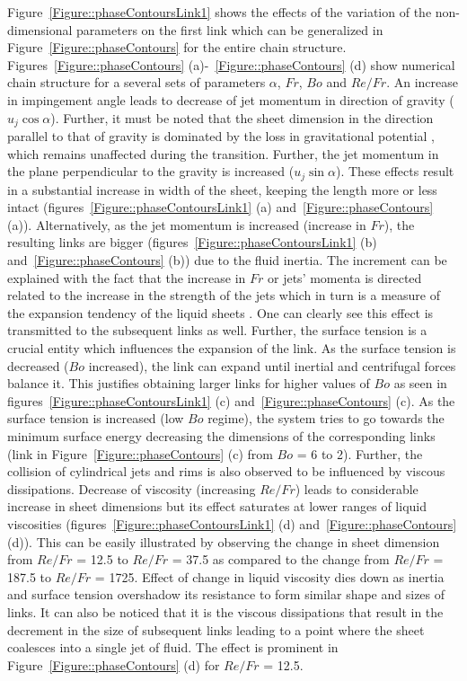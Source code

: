 Figure~\ref{Figure::phaseContoursLink1} shows the effects of the variation of the non-dimensional parameters on the first link which can be generalized in Figure~\ref{Figure::phaseContours} for the entire chain structure. Figures~\ref{Figure::phaseContours} (a)-~\ref{Figure::phaseContours} (d) show numerical chain structure for a several sets of parameters $\alpha$, $Fr$, $Bo$ and $Re/Fr$. An increase in impingement angle leads to decrease of jet momentum in direction of gravity ($u_j\cos\alpha$). Further, it must be noted that the sheet dimension in the direction parallel to that of gravity is dominated by the loss in gravitational potential \citep{taylor1960formation}, which remains unaffected during the transition. Further, the jet momentum in the plane perpendicular to the gravity is increased ($u_j\sin\alpha$). These effects result in a substantial increase in width of the sheet, keeping the length more or less intact (figures~\ref{Figure::phaseContoursLink1} (a) and~\ref{Figure::phaseContours} (a)). Alternatively, as the jet momentum is increased (increase in $Fr$), the resulting links are bigger (figures~\ref{Figure::phaseContoursLink1} (b) and~\ref{Figure::phaseContours} (b)) due to the fluid inertia. The increment can be explained with the fact that the increase in $Fr$ or jets' momenta is directed related to the increase in the strength of the jets which in turn is a measure of the expansion tendency of the liquid sheets \citep{yang2014liquid}. One can clearly see this effect is transmitted to the subsequent links as well. Further, the surface tension is a crucial entity which influences the expansion of the link. As the surface tension is decreased ($Bo$ increased), the link can expand until inertial and centrifugal forces balance it. This justifies obtaining larger links for higher values of $Bo$ as seen in figures~\ref{Figure::phaseContoursLink1} (c) and~\ref{Figure::phaseContours} (c). As the surface tension is increased (low $Bo$ regime), the system tries to go towards the minimum surface energy decreasing the dimensions of the corresponding links (link in Figure~\ref{Figure::phaseContours} (c) from $Bo$ = 6 to 2). Further, the collision of cylindrical jets and rims is also observed to be influenced by viscous dissipations. Decrease of viscosity (increasing $Re/Fr$) leads to considerable increase in sheet dimensions but its effect saturates at lower ranges of liquid viscosities (figures~\ref{Figure::phaseContoursLink1} (d) and~\ref{Figure::phaseContours} (d)). This can be easily illustrated by observing the change in sheet dimension from $Re/Fr$ = 12.5 to $Re/Fr$ = 37.5 as compared to the change from $Re/Fr$ = 187.5 to $Re/Fr$ = 1725. Effect of change in liquid viscosity dies down as inertia and surface tension overshadow its resistance to form similar shape and sizes of links. It can also be noticed that it is the viscous dissipations that result in the decrement in the size of subsequent links leading to a point where the sheet coalesces into a single jet of fluid. The effect is prominent in Figure~\ref{Figure::phaseContours} (d) for $Re/Fr$ = 12.5.
